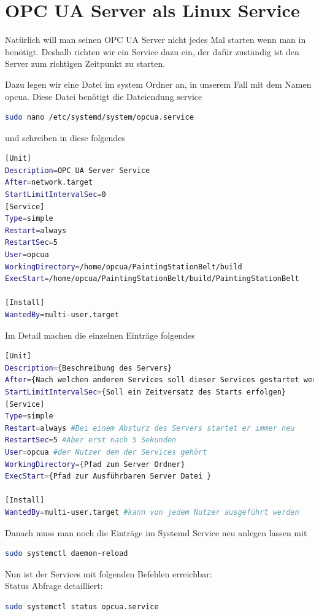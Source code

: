 \clearpage
\section{OPC UA Server als Linux Service}
Natürlich will man seinen OPC UA Server nicht jedes Mal starten wenn man in benötigt. Deshalb richten wir ein Service dazu ein, der dafür zuständig ist den Server zum richtigen Zeitpunkt zu starten.

Dazu legen wir eine Datei im system Ordner an, in unserem Fall mit dem Namen opcua. Diese Datei benötigt die Dateiendung service
\begin{lstlisting}[language=Bash]
sudo nano /etc/systemd/system/opcua.service
\end{lstlisting}

und schreiben in diese folgendes
\begin{lstlisting}[language=Bash]
[Unit]
Description=OPC UA Server Service
After=network.target
StartLimitIntervalSec=0
[Service]
Type=simple
Restart=always
RestartSec=5
User=opcua
WorkingDirectory=/home/opcua/PaintingStationBelt/build
ExecStart=/home/opcua/PaintingStationBelt/build/PaintingStationBelt

[Install]
WantedBy=multi-user.target
\end{lstlisting}

Im Detail machen die einzelnen Einträge folgendes
\begin{lstlisting}[language=Bash]
[Unit]
Description={Beschreibung des Servers}
After={Nach welchen anderen Services soll dieser Services gestartet werden}
StartLimitIntervalSec={Soll ein Zeitversatz des Starts erfolgen}
[Service]
Type=simple 
Restart=always #Bei einem Absturz des Servers startet er immer neu 
RestartSec=5 #Aber erst nach 5 Sekunden
User=opcua #der Nutzer dem der Services gehört
WorkingDirectory={Pfad zum Server Ordner}
ExecStart={Pfad zur Ausführbaren Server Datei }

[Install]
WantedBy=multi-user.target #kann von jedem Nutzer ausgeführt werden
\end{lstlisting}

Danach muss man noch die Einträge im Systemd Service neu anlegen lassen mit
\begin{lstlisting}[language=Bash]
sudo systemctl daemon-reload
\end{lstlisting}

Nun ist der Services mit folgenden Befehlen erreichbar: \\


Status Abfrage detailliert:
\begin{lstlisting}[language=Bash]
sudo systemctl status opcua.service
\end{lstlisting}

